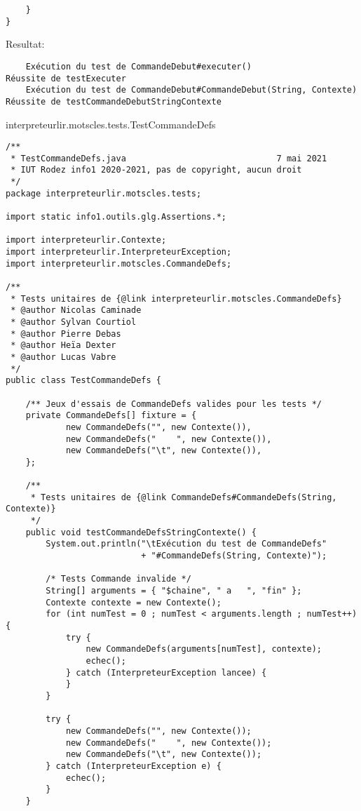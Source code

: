 \begin{enum}
\begin{verbatim}
    }
}
\end{verbatim}
Resultat:
\begin{verbatim}
    Exécution du test de CommandeDebut#executer()
Réussite de testExecuter
    Exécution du test de CommandeDebut#CommandeDebut(String, Contexte)
Réussite de testCommandeDebutStringContexte
\end{verbatim}

    \item interpreteurlir.motscles.tests.TestCommandeDefs
\begin{verbatim}
/**
 * TestCommandeDefs.java                              7 mai 2021
 * IUT Rodez info1 2020-2021, pas de copyright, aucun droit
 */
package interpreteurlir.motscles.tests;

import static info1.outils.glg.Assertions.*;

import interpreteurlir.Contexte;
import interpreteurlir.InterpreteurException;
import interpreteurlir.motscles.CommandeDefs;

/**
 * Tests unitaires de {@link interpreteurlir.motscles.CommandeDefs}
 * @author Nicolas Caminade
 * @author Sylvan Courtiol
 * @author Pierre Debas
 * @author Heïa Dexter
 * @author Lucas Vabre
 */
public class TestCommandeDefs {
 
    /** Jeux d'essais de CommandeDefs valides pour les tests */
    private CommandeDefs[] fixture = { 
            new CommandeDefs("", new Contexte()),
            new CommandeDefs("    ", new Contexte()),
            new CommandeDefs("\t", new Contexte()),
    };
    
    /**
     * Tests unitaires de {@link CommandeDefs#CommandeDefs(String, Contexte)}
     */
    public void testCommandeDefsStringContexte() {
        System.out.println("\tExécution du test de CommandeDefs"
                           + "#CommandeDefs(String, Contexte)");
        
        /* Tests Commande invalide */
        String[] arguments = { "$chaine", " a   ", "fin" };
        Contexte contexte = new Contexte();
        for (int numTest = 0 ; numTest < arguments.length ; numTest++) {
            try {
                new CommandeDefs(arguments[numTest], contexte);
                echec();
            } catch (InterpreteurException lancee) { 
            }
        }
        
        try {
            new CommandeDefs("", new Contexte());
            new CommandeDefs("    ", new Contexte());
            new CommandeDefs("\t", new Contexte());
        } catch (InterpreteurException e) {
            echec();
        }
    }
    

\end{verbatim}
\end{enum}
